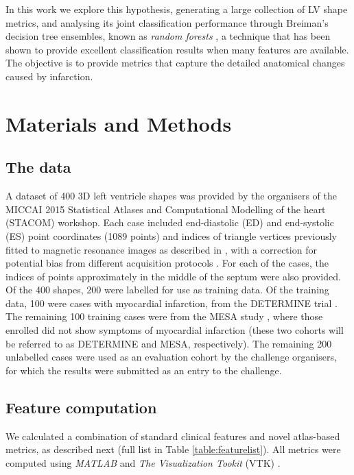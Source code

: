 \documentclass{llncs}
\begin{document}


In this work we explore this hypothesis, generating a large collection of LV shape metrics, and analysing its joint classification performance through Breiman's decision tree ensembles, known as \emph{random forests} \cite{Breiman2001}, a technique that has been shown to provide excellent classification results when many features are available. The objective is to provide metrics that capture the detailed anatomical changes caused by infarction.


\section{Materials and Methods}
	\subsection{The data}
A dataset of 400 3D left ventricle shapes was provided by the organisers of the MICCAI 2015 Statistical Atlases and Computational Modelling of the heart (STACOM) workshop. Each case included end-diastolic (ED) and end-systolic (ES) point coordinates (1089 points) and indices of triangle vertices previously fitted to magnetic resonance images as described in \cite{Young2000}, with a correction for potential bias from different acquisition protocols \cite{Medrano-Gracia2013}. For each of the cases, the indices of points approximately in the middle of the septum were also provided. Of the 400 shapes, 200 were labelled for use as training data. Of the training data, 100 were cases with myocardial infarction, from the DETERMINE trial \cite{Kadish2009}. The remaining 100 training cases were from the MESA study \cite{Bild2002}, where those enrolled did not show symptoms of myocardial infarction (these two cohorts will be referred to as DETERMINE and MESA, respectively). The remaining 200 unlabelled cases were used as an evaluation cohort by the challenge organisers, for which the results were submitted as an entry to the challenge. 


	\subsection{Feature computation}
	We calculated a combination of standard clinical features and novel atlas-based metrics, as described next (full list in Table \ref{table:featurelist}). All metrics were computed using \emph{\mbox{MATLAB}} and \emph{The Visualization Tookit} (VTK) \cite{Schroeder2006}.
\end{document}
